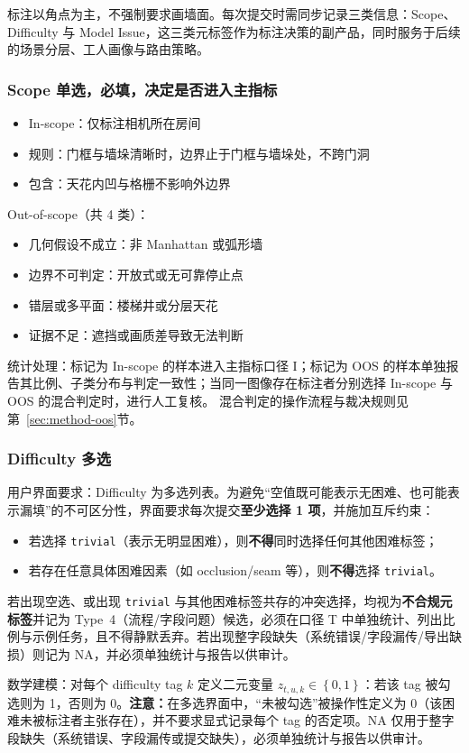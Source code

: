 标注以角点为主，不强制要求画墙面。每次提交时需同步记录三类信息：Scope、Difficulty 与 Model Issue，这三类元标签作为标注决策的副产品，同时服务于后续的场景分层、工人画像与路由策略。
\subsubsection{Scope 单选，必填，决定是否进入主指标}
\begin{itemize}
    \item In-scope：仅标注相机所在房间
    \item 规则：门框与墙垛清晰时，边界止于门框与墙垛处，不跨门洞
    \item 包含：天花内凹与格栅不影响外边界
\end{itemize}
Out-of-scope（共 4 类）：
\begin{itemize}
    \item 几何假设不成立：非 Manhattan 或弧形墙
    \item 边界不可判定：开放式或无可靠停止点
    \item 错层或多平面：楼梯井或分层天花
    \item 证据不足：遮挡或画质差导致无法判断
\end{itemize}
    
统计处理：标记为 In-scope 的样本进入主指标口径 I；标记为 OOS 的样本单独报告其比例、子类分布与判定一致性；当同一图像存在标注者分别选择 In-scope 与 OOS 的混合判定时，进行人工复核。
混合判定的操作流程与裁决规则见第~\ref{sec:method-oos}节。
\subsubsection{Difficulty 多选}
用户界面要求：Difficulty 为多选列表。为避免“空值既可能表示无困难、也可能表示漏填”的不可区分性，界面要求每次提交\textbf{至少选择 1 项}，并施加互斥约束：
\begin{itemize}
    \item 若选择 \texttt{trivial}（表示无明显困难），则\textbf{不得}同时选择任何其他困难标签；
    \item 若存在任意具体困难因素（如 occlusion/seam 等），则\textbf{不得}选择 \texttt{trivial}。
\end{itemize}
若出现空选、或出现 \texttt{trivial} 与其他困难标签共存的冲突选择，均视为\textbf{不合规元标签}并记为 Type~4（流程/字段问题）候选，必须在口径 T 中单独统计、列出比例与示例任务，且不得静默丢弃。若出现整字段缺失（系统错误/字段漏传/导出缺损）则记为 NA，并必须单独统计与报告以供审计。

数学建模：对每个 difficulty tag $k$ 定义二元变量 $z_{t,u,k}\in\left\{0,1\right\}$：若该 tag 被勾选则为 1，否则为 0。\textbf{注意：}在多选界面中，“未被勾选”被操作性定义为 0（该困难未被标注者主张存在），并不要求显式记录每个 tag 的否定项。NA 仅用于整字段缺失（系统错误、字段漏传或提交缺失），必须单独统计与报告以供审计。

